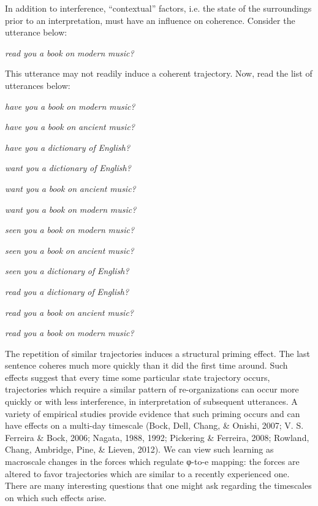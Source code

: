   In addition to interference, “contextual” factors, i.e. the state of the surroundings prior to an interpretation, must have an influence on coherence. Consider the utterance below:

    \textit{read} \textit{you} \textit{a} \textit{book} \textit{on} \textit{modern} \textit{music?}

This utterance may not readily induce a coherent trajectory. Now, read the list of utterances below:

\textit{have} \textit{you} \textit{a} \textit{book} \textit{on} \textit{modern} \textit{music?}

\textit{have} \textit{you} \textit{a} \textit{book} \textit{on} \textit{ancient} \textit{music?}

\textit{have} \textit{you} \textit{a} \textit{dictionary} \textit{of} \textit{English?}

\textit{want} \textit{you} \textit{a} \textit{dictionary} \textit{of} \textit{English?}

\textit{want} \textit{you} \textit{a} \textit{book} \textit{on} \textit{ancient} \textit{music?}

\textit{want} \textit{you} \textit{a} \textit{book} \textit{on} \textit{modern} \textit{music?}

\textit{seen} \textit{you} \textit{a} \textit{book} \textit{on} \textit{modern} \textit{music?}

\textit{seen} \textit{you} \textit{a} \textit{book} \textit{on} \textit{ancient} \textit{music?}

\textit{seen} \textit{you} \textit{a} \textit{dictionary} \textit{of} \textit{English?}

\textit{read} \textit{you} \textit{a} \textit{dictionary} \textit{of} \textit{English?}

\textit{read} \textit{you} \textit{a} \textit{book} \textit{on} \textit{ancient} \textit{music?}

\textit{read} \textit{you} \textit{a} \textit{book} \textit{on} \textit{modern} \textit{music?}

  The repetition of similar trajectories induces a structural priming effect. The last sentence coheres much more quickly than it did the first time around. Such effects suggest that every time some particular state trajectory occurs, trajectories which require a similar pattern of re-organizations can occur more quickly or with less interference, in interpretation of subsequent utterances. A variety of empirical studies provide evidence that such priming occurs and can have effects on a multi-day timescale (Bock, Dell, Chang, \& Onishi, 2007; V. S. Ferreira \& Bock, 2006; Nagata, 1988, 1992; Pickering \& Ferreira, 2008; Rowland, Chang, Ambridge, Pine, \& Lieven, 2012). We can view such learning as macroscale changes in the forces which regulate φ-to-e mapping: the forces are altered to favor trajectories which are similar to a recently experienced one. There are many interesting questions that one might ask regarding the timescales on which such effects arise.

